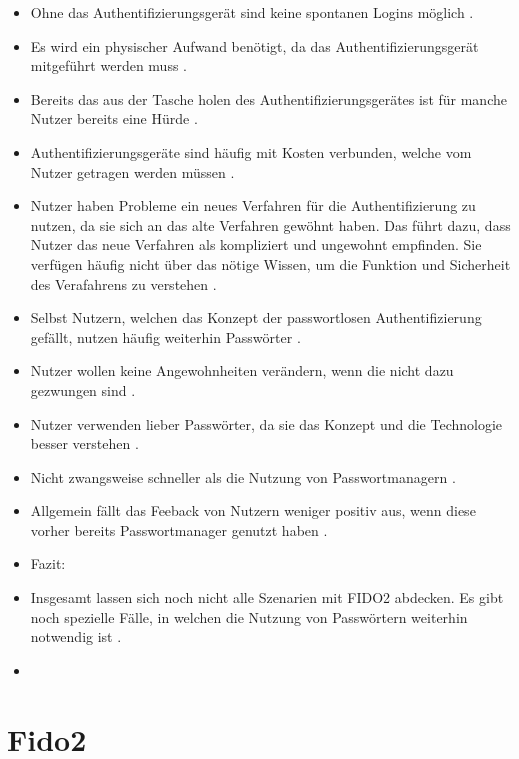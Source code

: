 \begin{itemize}
    \item Ohne das Authentifizierungsgerät sind keine spontanen Logins möglich \cite{lyastani2020fido2}.
    \item Es wird ein physischer Aufwand benötigt, da das Authentifizierungsgerät mitgeführt werden muss \cite{lyastani2020fido2}.
    \item Bereits das aus der Tasche holen des Authentifizierungsgerätes ist für manche Nutzer bereits eine Hürde \cite{farke2020you}.
    \item Authentifizierungsgeräte sind häufig mit Kosten verbunden, welche vom Nutzer getragen werden müssen \cite{lyastani2020fido2}.
    \item Nutzer haben Probleme ein neues Verfahren für die Authentifizierung zu nutzen, da sie sich an das alte Verfahren gewöhnt haben. Das führt dazu, dass Nutzer das neue Verfahren als kompliziert und ungewohnt empfinden. Sie verfügen häufig nicht über das nötige Wissen, um die Funktion und Sicherheit des Verafahrens zu verstehen \cite{lyastani2020fido2}.
    \item Selbst Nutzern, welchen das Konzept der passwortlosen Authentifizierung gefällt, nutzen häufig weiterhin Passwörter \cite{farke2020you}.
    \item Nutzer wollen keine Angewohnheiten verändern, wenn die nicht dazu gezwungen sind \cite{farke2020you}.
    \item Nutzer verwenden lieber Passwörter, da sie das Konzept und die Technologie besser verstehen \cite{lyastani2020fido2}.
    \item Nicht zwangsweise schneller als die Nutzung von Passwortmanagern \cite{farke2020you}.
    \item Allgemein fällt das Feeback von Nutzern weniger positiv aus, wenn diese vorher bereits Passwortmanager genutzt haben \cite{farke2020you}.
    \item Fazit:
    \item Insgesamt lassen sich noch nicht alle Szenarien mit FIDO2 abdecken. Es gibt noch spezielle Fälle, in welchen die Nutzung von Passwörtern weiterhin notwendig ist \cite{lyastani2020fido2}.
    \item 
\end{itemize}

\section{Fido2}

